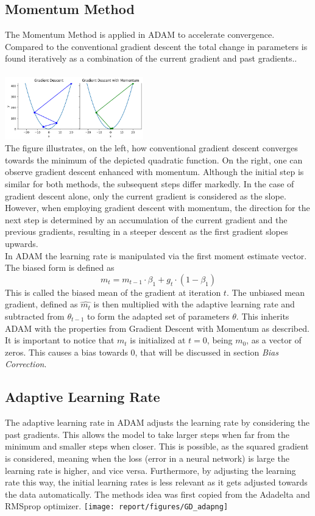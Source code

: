\documentclass[journal]{IEEEtran}
\begin{document}
\subsection{Momentum Method}
The Momentum Method is applied in ADAM to accelerate convergence. Compared to the conventional gradient descent the total change in parameters is found iteratively as a combination of the current gradient and past gradients.. \\\\
\includegraphics[width=0.45\textwidth]{report/figures/GD_momentum.png}\\
The figure illustrates, on the left, how conventional gradient descent converges towards the minimum of the depicted quadratic function. On the right, one can observe gradient descent enhanced with momentum. Although the initial step is similar for both methods, the subsequent steps differ markedly. In the case of gradient descent alone, only the current gradient is considered as the slope. However, when employing gradient descent with momentum, the direction for the next step is determined by an accumulation of the current gradient and the previous gradients, resulting in a steeper descent as the first gradient slopes upwards.\\
In ADAM the learning rate is manipulated via the first moment estimate vector. The biased form is defined as 
$$m_t=m_{t-1}\cdot \beta_1 + g_t\cdot (1-\beta_1)$$
This is called the biased mean of the gradient at iteration $t$. The unbiased mean gradient, defined as $\hat{m_t}$ is then multiplied with the adaptive learning rate and subtracted from $\theta_{t-1}$ to form the adapted set of parameters $\theta$. This inherits ADAM with the properties from Gradient Descent with Momentum as described.\\
It is important to notice that $m_t$ is initialized at $t=0$, being $m_0$, as a vector of zeros. This causes a bias towards $0$, that will be discussed in section \textit{Bias Correction}.


\subsection{Adaptive Learning Rate}
The adaptive learning rate in ADAM adjusts the learning rate by considering the past gradients. This allows the model to take larger steps when far from the minimum and smaller steps when closer. This is possible, as the squared gradient is considered, meaning when the loss (error in a neural network) is large the learning rate is higher, and vice versa. Furthermore, by adjusting the learning rate this way, the initial learning rates is less relevant as it gets adjusted towards the data automatically. The methods idea was first copied from the Adadelta and RMSprop optimizer.
\texttt{[image: report/figures/GD\_adapng]}\\
\end{document}
